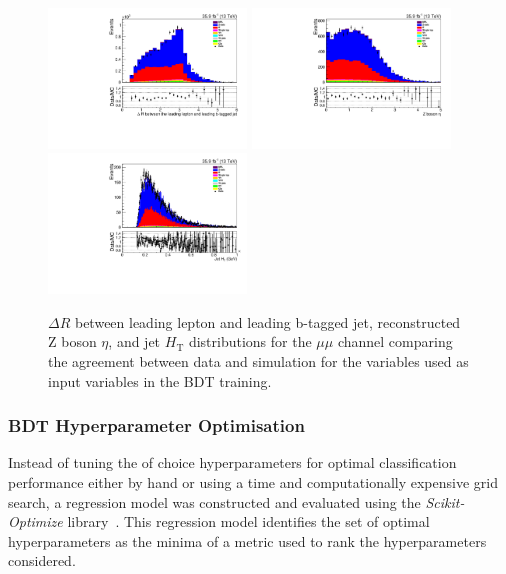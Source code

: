 \begin{figure}[htb]
\centering
\includegraphics[width=0.47\textwidth]{figs/background-estimation/plots/unblinded/prompt_mumu_ttbarInc/zLep1BjetDelR_NPL_mumu_wMass_mumu.pdf}
\includegraphics[width=0.47\textwidth]{figs/background-estimation/plots/unblinded/prompt_mumu_ttbarInc/zPairEta_NPL_mumu_wMass_mumu.pdf}
\\
\includegraphics[width=0.47\textwidth]{figs/background-estimation/plots/unblinded/prompt_mumu_ttbarInc/jetHt_NPL_mumu_wMass_mumu.pdf}
\caption{
$\Delta R$ between leading lepton and leading b-tagged jet, reconstructed Z boson $\eta$, and jet ${\ensuremath{H_{\mathrm{T}}}}$ distributions for the $\mu\mu$ channel comparing the agreement between data and simulation for the variables used as input variables in the BDT training.}
\label{fig:inputFeaturesDataSimAgreement5}
\end{figure}

\subsubsection*{BDT Hyperparameter Optimisation}
Instead of tuning the of choice hyperparameters for optimal classification performance either by hand or using a time and computationally expensive grid search, a regression model was constructed and evaluated using the \emph{Scikit-Optimize} library~\cite{scikit-optimise}.
This regression model identifies the set of optimal hyperparameters as the minima of a metric used to rank the hyperparameters considered.

